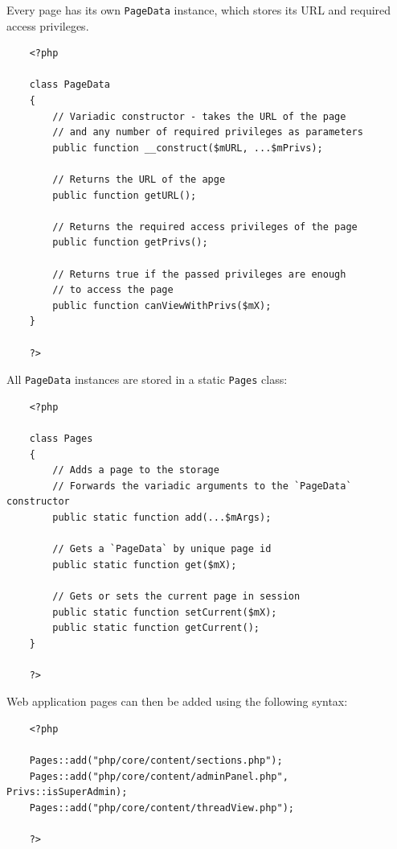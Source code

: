 \documentclass[12pt]{report}
\begin{document}
                    Every page has its own \texttt{PageData} instance, which stores its URL and required access privileges.

                    \begin{verbatim}
    <?php

    class PageData
    {
        // Variadic constructor - takes the URL of the page
        // and any number of required privileges as parameters
        public function __construct($mURL, ...$mPrivs);

        // Returns the URL of the apge
        public function getURL();

        // Returns the required access privileges of the page
        public function getPrivs();

        // Returns true if the passed privileges are enough
        // to access the page
        public function canViewWithPrivs($mX);
    }

    ?>
                    \end{verbatim}

                    All \texttt{PageData} instances are stored in a static \texttt{Pages} class:

                    \begin{verbatim}
    <?php

    class Pages
    {
        // Adds a page to the storage
        // Forwards the variadic arguments to the `PageData` constructor
        public static function add(...$mArgs);

        // Gets a `PageData` by unique page id
        public static function get($mX);

        // Gets or sets the current page in session
        public static function setCurrent($mX);
        public static function getCurrent();
    }

    ?>
                    \end{verbatim}

                    Web application pages can then be added using the following syntax:

                    \begin{verbatim}
    <?php

    Pages::add("php/core/content/sections.php");
    Pages::add("php/core/content/adminPanel.php", Privs::isSuperAdmin);
    Pages::add("php/core/content/threadView.php");

    ?>
                    \end{verbatim}
\end{document}
